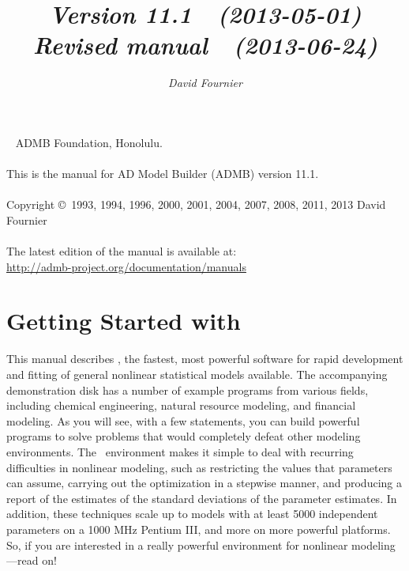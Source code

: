 \documentclass{admbmanual}
\newcommand\admbversion{11.1}
\begin{document}
\title{%
  \vspace{3ex}\textsf{\textit{Version \admbversion~~(2013-05-01)\\[3pt]
      Revised manual~~(2013-06-24)}}\vspace{3ex}
}
\author{\textsf{\textit{David Fournier}}}
\maketitle

~\vfill
\noindent ADMB Foundation, Honolulu.\\\\
\noindent This is the manual for AD Model Builder (ADMB) version
\admbversion.\\\\
\noindent Copyright \copyright\ 1993, 1994, 1996, 2000, 2001, 2004, 2007, 2008,
2011, 2013 David Fournier\\\\
\noindent The latest edition of the manual is available at:\\
\url{http://admb-project.org/documentation/manuals}

\tableofcontents

\chapter{Getting Started with \ADM}

This manual describes \ADM, the fastest, most powerful software for rapid
development and fitting of general nonlinear statistical models available. The
accompanying demonstration disk has a number of example programs from various
fields, including chemical engineering, natural resource modeling, and financial
modeling. As you will see, with a few statements, you can build powerful
programs to solve problems that would completely defeat other modeling
environments. The \ADM\ environment makes it simple to deal with recurring
difficulties in nonlinear modeling, such as restricting the values that
parameters can assume, carrying out the optimization in a stepwise manner, and
producing a report of the estimates of the standard deviations of the parameter
estimates. In addition, these techniques scale up to models with at least 5000
independent parameters on a 1000 MHz Pentium III, and more on more powerful
platforms. So, if you are interested in a really powerful environment for
nonlinear modeling---read on!
\end{document}

